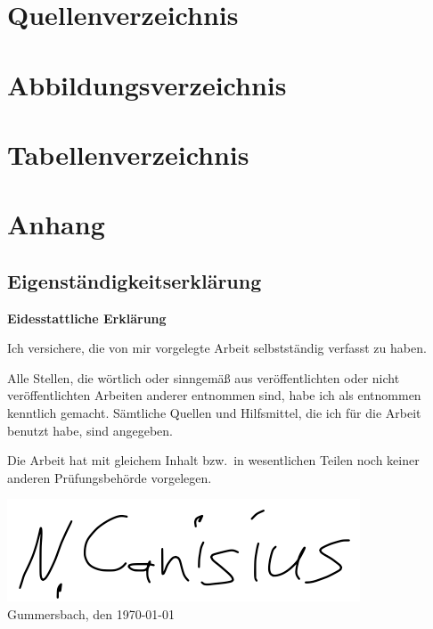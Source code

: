 \appendix

\newpage


\section{Quellenverzeichnis}
\printbibliography


\section{Abbildungsverzeichnis}
\listoffigures


\section{Tabellenverzeichnis}
\listoftables

\newpage


\section{Anhang}

\subsection{Eigenständigkeitserklärung}

\textbf{Eidesstattliche Erklärung}

Ich versichere, die von mir vorgelegte Arbeit selbstständig verfasst zu haben.

Alle Stellen, die wörtlich oder sinngemäß aus veröffentlichten oder nicht veröffentlichten Arbeiten anderer entnommen sind, habe ich als entnommen kenntlich gemacht.
Sämtliche Quellen und Hilfsmittel, die ich für die Arbeit benutzt habe, sind angegeben.

Die Arbeit hat mit gleichem Inhalt bzw.\ in wesentlichen Teilen noch keiner anderen Prüfungsbehörde vorgelegen.

\includegraphics[scale=0.5]{assets/signature}\\
Gummersbach, den \today

